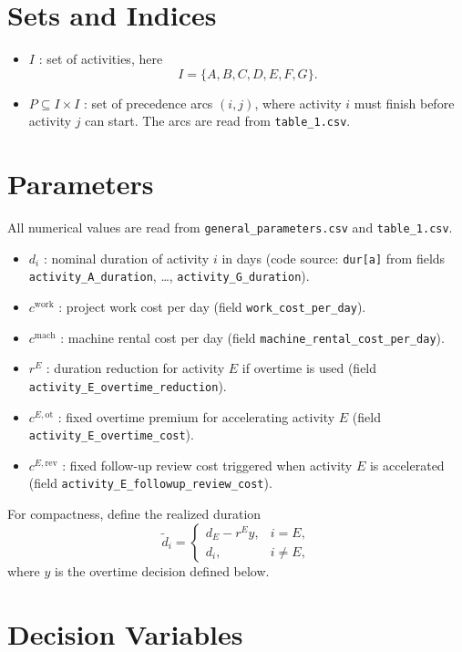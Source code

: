 \section*{Sets and Indices}

\begin{itemize}
    \item $I$ : set of activities, here
    \[
    I=\{A,B,C,D,E,F,G\}.
    \]
    \item $P \subseteq I \times I$ : set of precedence arcs $(i,j)$, where activity $i$ must finish before activity $j$ can start. The arcs are read from \texttt{table\_1.csv}.
\end{itemize}

\section*{Parameters}

All numerical values are read from \texttt{general\_parameters.csv} and \texttt{table\_1.csv}.

\begin{itemize}
    \item $d_i$ : nominal duration of activity $i$ in days (code source: \texttt{dur[a]} from fields \texttt{activity\_A\_duration}, \ldots, \texttt{activity\_G\_duration}).
    \item $c^{\text{work}}$ : project work cost per day (field \texttt{work\_cost\_per\_day}).
    \item $c^{\text{mach}}$ : machine rental cost per day (field \texttt{machine\_rental\_cost\_per\_day}).
    \item $r^{E}$ : duration reduction for activity $E$ if overtime is used (field \texttt{activity\_E\_overtime\_reduction}).
    \item $c^{E,\text{ot}}$ : fixed overtime premium for accelerating activity $E$ (field \texttt{activity\_E\_overtime\_cost}).
    \item $c^{E,\text{rev}}$ : fixed follow-up review cost triggered when activity $E$ is accelerated (field \texttt{activity\_E\_followup\_review\_cost}).
\end{itemize}

For compactness, define the realized duration
\[
\tilde d_i =
\begin{cases}
d_E - r^E y, & i=E,\\
d_i, & i\neq E,
\end{cases}
\]
where $y$ is the overtime decision defined below.

\section*{Decision Variables}

